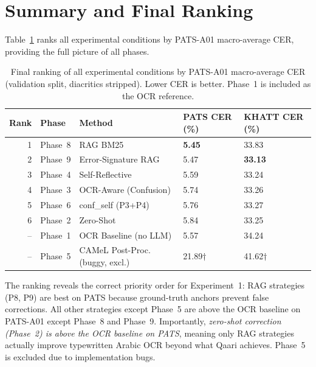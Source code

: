 \section{Summary and Final Ranking}
\label{sec:res_summary}

Table~\ref{tab:final_ranking} ranks all experimental conditions by
PATS-A01 macro-average CER, providing the full picture of all phases.

\begin{table}[htbp]
  \centering
  \caption{Final ranking of all experimental conditions by PATS-A01
           macro-average CER (validation split, diacritics stripped).
           Lower CER is better. Phase~1 is included as the OCR reference.}
  \label{tab:final_ranking}
  \begin{tabularx}{\textwidth}{rllXX}
    \toprule
    \textbf{Rank} & \textbf{Phase} & \textbf{Method}
      & \textbf{PATS CER (\%)} & \textbf{KHATT CER (\%)} \\
    \midrule
    1  & Phase~8 & RAG BM25                              & \textbf{5.45} & 33.83 \\
    2  & Phase~9 & Error-Signature RAG                   & 5.47 & \textbf{33.13} \\
    3  & Phase~4 & Self-Reflective                       & 5.59 & 33.24 \\
    4  & Phase~3 & OCR-Aware (Confusion)                 & 5.74 & 33.26 \\
    5  & Phase~6 & conf\_self (P3+P4)                    & 5.76 & 33.27 \\
    6  & Phase~2 & Zero-Shot                             & 5.84 & 33.25 \\
    -- & Phase~1 & OCR Baseline (no LLM)                & 5.57 & 34.24 \\
    -- & Phase~5 & CAMeL Post-Proc. (buggy, excl.)       & 21.89$\dagger$ & 41.62$\dagger$ \\
    \bottomrule
  \end{tabularx}
\end{table}

The ranking reveals the correct priority order for Experiment~1: RAG
strategies (P8, P9) are best on PATS because ground-truth anchors prevent
false corrections. All other strategies except Phase~5 are above the OCR
baseline on PATS-A01 except Phase~8 and Phase~9. Importantly, \emph{zero-shot
correction (Phase~2) is above the OCR baseline on PATS}, meaning only RAG
strategies actually improve typewritten Arabic OCR beyond what Qaari achieves.
Phase~5 is excluded due to implementation bugs.

